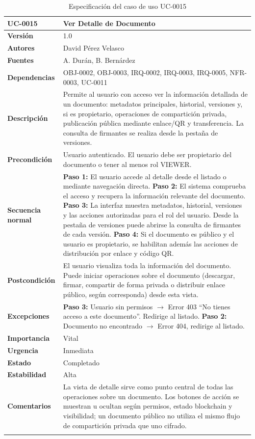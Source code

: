 \documentclass[11pt, a4paper]{article}
\begin{document}
\begin{longtable}{|p{4cm}|p{10cm}|}
\hline
\textbf{UC-0015} & Ver Detalle de Documento \\
\hline
\textbf{Versión} & 1.0 \\
\hline
\textbf{Autores} & David Pérez Velasco \\
\hline
\textbf{Fuentes} & A. Durán, B. Bernárdez \\
\hline
\textbf{Dependencias} & OBJ-0002, OBJ-0003, IRQ-0002, IRQ-0003, IRQ-0005, NFR-0003, UC-0011 \\
\hline
\textbf{Descripción} & Permite al usuario con acceso ver la información detallada de un documento: metadatos principales, historial, versiones y, si es propietario, operaciones de compartición privada, publicación pública mediante enlace/QR y transferencia. La consulta de firmantes se realiza desde la pestaña de versiones. \\
\hline
\textbf{Precondición} & Usuario autenticado. El usuario debe ser propietario del documento o tener al menos rol VIEWER. \\
\hline
\textbf{Secuencia normal} &
\textbf{Paso 1:} El usuario accede al detalle desde el listado o mediante navegación directa.\newline
\textbf{Paso 2:} El sistema comprueba el acceso y recupera la información relevante del documento.\newline
\textbf{Paso 3:} La interfaz muestra metadatos, historial, versiones y las acciones autorizadas para el rol del usuario. Desde la pestaña de versiones puede abrirse la consulta de firmantes de cada versión.\newline
\textbf{Paso 4:} Si el documento es público y el usuario es propietario, se habilitan además las acciones de distribución por enlace y código QR.\\
\hline
\textbf{Postcondición} & El usuario visualiza toda la información del documento. Puede iniciar operaciones sobre el documento (descargar, firmar, compartir de forma privada o distribuir enlace público, según corresponda) desde esta vista. \\
\hline
\textbf{Excepciones} &
\textbf{Paso 3:} Usuario sin permisos $\rightarrow$ Error 403 ``No tienes acceso a este documento''. Redirige al listado.\newline
\textbf{Paso 2:} Documento no encontrado $\rightarrow$ Error 404, redirige al listado.\\
\hline
\textbf{Importancia} & Vital \\
\hline
\textbf{Urgencia} & Inmediata \\
\hline
\textbf{Estado} & Completado \\
\hline
\textbf{Estabilidad} & Alta \\
\hline
\textbf{Comentarios} & La vista de detalle sirve como punto central de todas las operaciones sobre un documento. Los botones de acción se muestran u ocultan según permisos, estado blockchain y visibilidad; un documento público no utiliza el mismo flujo de compartición privada que uno cifrado. \\
\hline
\caption{Especificación del caso de uso UC-0015}
\end{longtable}
\end{document}
